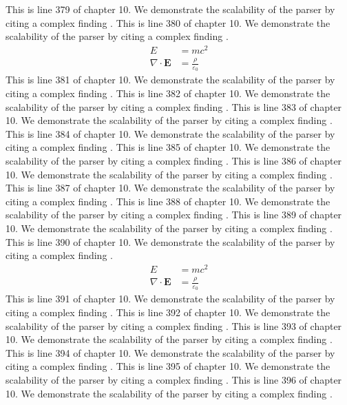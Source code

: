 This is line 379 of chapter 10. We demonstrate the scalability of the parser by citing a complex finding \cite{ref10_379}.
This is line 380 of chapter 10. We demonstrate the scalability of the parser by citing a complex finding \cite{ref10_380}.
\begin{align*}
  E &= mc^2 \\
  \nabla \cdot \mathbf{E} &= \frac{\rho}{\varepsilon_0}
\end{align*}
This is line 381 of chapter 10. We demonstrate the scalability of the parser by citing a complex finding \cite{ref10_381}.
This is line 382 of chapter 10. We demonstrate the scalability of the parser by citing a complex finding \cite{ref10_382}.
This is line 383 of chapter 10. We demonstrate the scalability of the parser by citing a complex finding \cite{ref10_383}.
This is line 384 of chapter 10. We demonstrate the scalability of the parser by citing a complex finding \cite{ref10_384}.
This is line 385 of chapter 10. We demonstrate the scalability of the parser by citing a complex finding \cite{ref10_385}.
This is line 386 of chapter 10. We demonstrate the scalability of the parser by citing a complex finding \cite{ref10_386}.
This is line 387 of chapter 10. We demonstrate the scalability of the parser by citing a complex finding \cite{ref10_387}.
This is line 388 of chapter 10. We demonstrate the scalability of the parser by citing a complex finding \cite{ref10_388}.
This is line 389 of chapter 10. We demonstrate the scalability of the parser by citing a complex finding \cite{ref10_389}.
This is line 390 of chapter 10. We demonstrate the scalability of the parser by citing a complex finding \cite{ref10_390}.
\begin{align*}
  E &= mc^2 \\
  \nabla \cdot \mathbf{E} &= \frac{\rho}{\varepsilon_0}
\end{align*}
This is line 391 of chapter 10. We demonstrate the scalability of the parser by citing a complex finding \cite{ref10_391}.
This is line 392 of chapter 10. We demonstrate the scalability of the parser by citing a complex finding \cite{ref10_392}.
This is line 393 of chapter 10. We demonstrate the scalability of the parser by citing a complex finding \cite{ref10_393}.
This is line 394 of chapter 10. We demonstrate the scalability of the parser by citing a complex finding \cite{ref10_394}.
This is line 395 of chapter 10. We demonstrate the scalability of the parser by citing a complex finding \cite{ref10_395}.
This is line 396 of chapter 10. We demonstrate the scalability of the parser by citing a complex finding \cite{ref10_396}.
